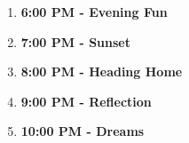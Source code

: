 \documentclass{article}
\begin{document}
\begin{enumerate}
\begin{itemize}
\end{itemize}
\item \textbf{6:00 PM - Evening Fun}
\begin{itemize}
\end{itemize}
\item \textbf{7:00 PM - Sunset}
\begin{itemize}
\end{itemize}
\item \textbf{8:00 PM - Heading Home}
\begin{itemize}
\end{itemize}
\item \textbf{9:00 PM - Reflection}
\begin{itemize}
\end{itemize}
\item \textbf{10:00 PM - Dreams}
\begin{itemize}
\end{itemize}

\end{enumerate}
\end{document}
